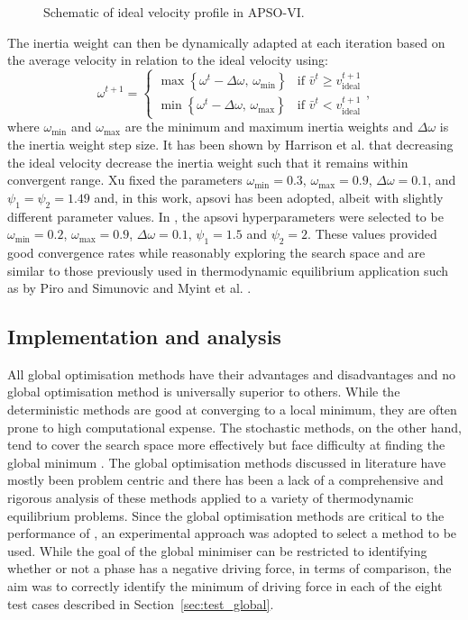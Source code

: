 \begin{enumerate}
\begin{figure}[htbp]
				\caption{Schematic of ideal velocity profile in APSO-VI.}
				\label{fig:APSO-ideal_v}
			\end{figure}
			The inertia weight can then be dynamically adapted at each iteration based on the average velocity in relation to the ideal velocity \cite{Harrison:2018aa} using:
			\begin{equation}
				\omega^{t+1} =  \begin{cases}
								\max \left\{ \omega^t - \Delta \omega, \, \omega_\text{min}\right\}& \text{if } \bar{v}^t \geq  {v}_\text{ideal}^{t+1}\\
								\min \left\{ \omega^t - \Delta \omega, \, \omega_\text{max}\right\}& \text{if } \bar{v}^t <  {v}_\text{ideal}^{t+1}
							\end{cases},
			\end{equation}
			where $\omega_\text{min}$ and $\omega_\text{max}$ are the minimum and maximum inertia weights and $\Delta \omega$ is the inertia weight step size. It has been shown by Harrison et al. \cite{Harrison:2016aa} that decreasing the ideal velocity decrease the inertia weight such that it remains within convergent range. Xu fixed the parameters $\omega_\text{min} = 0.3$, $\omega_\text{max} = 0.9$, $\Delta \omega = 0.1$, and $\psi_1 = \psi_2 = 1.49$ \cite{Xu:2013aa} and, in this work, \gls{apsovi} has been adopted, albeit with slightly different parameter values. In {\GEM}, the \gls{apsovi} hyperparameters were selected to be $\omega_\text{min} = 0.2$, $\omega_\text{max} = 0.9$, $\Delta \omega = 0.1$, $\psi_1 = 1.5$ and  $\psi_2 = 2$. These values provided good convergence rates while reasonably exploring the search space and are similar to those previously used in thermodynamic equilibrium application such as by Piro and Simunovic \cite{Piro16} and Myint et al. \cite{Myint:2021aa}.
	\end{enumerate}

	
	\subsection{Implementation and analysis}
	All global optimisation methods have their advantages and disadvantages and no global optimisation method is universally superior to others. While the deterministic methods are good at converging to a local minimum, they are often prone to high computational expense. The stochastic methods, on the other hand, tend to cover the search space more effectively but face difficulty at finding the global minimum \cite{Piro16}. The global optimisation methods discussed in literature have mostly been problem centric and there has been a lack of a comprehensive and rigorous analysis of these methods applied to a variety of thermodynamic equilibrium problems. 	Since the global optimisation methods are critical to the performance of {\GEM}, an experimental approach was adopted to select a method to be used. While the goal of the global minimiser can be restricted to identifying whether or not a phase has a negative driving force, in terms of comparison, the aim was to correctly identify the minimum of driving force in each of the eight test cases described in Section~\ref{sec:test_global}.  
	
